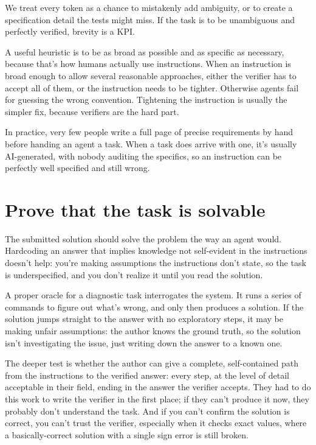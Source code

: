 \documentclass[11pt]{article}
\begin{document}
We treat every token as a chance to mistakenly add ambiguity, or to create a specification detail the tests might miss. If the task is to be unambiguous and perfectly verified, brevity is a KPI.

A useful heuristic is to be as broad as possible and as specific as necessary, because that's how humans actually use instructions. When an instruction is broad enough to allow several reasonable approaches, either the verifier has to accept all of them, or the instruction needs to be tighter. Otherwise agents fail for guessing the wrong convention. Tightening the instruction is usually the simpler fix, because verifiers are the hard part.

In practice, very few people write a full page of precise requirements by hand before handing an agent a task. When a task does arrive with one, it's usually AI-generated, with nobody auditing the specifics, so an instruction can be perfectly well specified and still wrong.

\section{Prove that the task is solvable}

The submitted solution should solve the problem the way an agent would. Hardcoding an answer that implies knowledge not self-evident in the instructions doesn't help: you’re making assumptions the instructions don't state, so the task is underspecified, and you don't realize it until you read the solution.

A proper oracle for a diagnostic task interrogates the system. It runs a series of commands to figure out what's wrong, and only then produces a solution. If the solution jumps straight to the answer with no exploratory steps, it may be making unfair assumptions: the author knows the ground truth, so the solution isn't investigating the issue, just writing down the answer to a known one.

The deeper test is whether the author can give a complete, self-contained path from the instructions to the verified answer: every step, at the level of detail acceptable in their field, ending in the answer the verifier accepts. They had to do this work to write the verifier in the first place; if they can't produce it now, they probably don't understand the task. And if you can't confirm the solution is correct, you can't trust the verifier, especially when it checks exact values, where a basically-correct solution with a single sign error is still broken.
\end{document}
